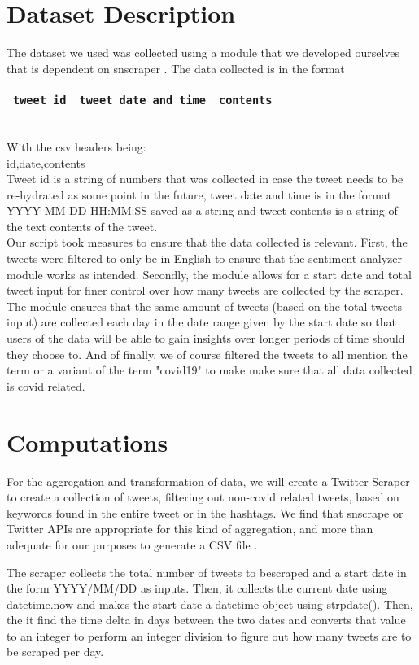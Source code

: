 \documentclass[fontsize=11pt]{article}
\begin{document}
\section*{Dataset Description}

The dataset we used was collected using a module that we developed ourselves that is dependent on snscraper \cite{snscrape}. The data collected is in the format\\
\begin{tabular}{|l|l|l|}
    \hline
    \verb|tweet id| & \verb|tweet date and time| & \verb|contents| \\
    \hline
\end{tabular} \\
With the csv headers being:\\
id,date,contents\\
Tweet id is a string of numbers that was collected in case the tweet needs to be re-hydrated as some point in the future, tweet date and time is in the format YYYY-MM-DD HH:MM:SS saved as a string and tweet contents is a string of the text contents of the tweet.  \\
Our script took measures to ensure that the data collected is relevant. First, the tweets were filtered to only be in English to ensure that the sentiment analyzer module works as intended. Secondly, the module allows for a start date and total tweet input for finer control over how many tweets are collected by the scraper. The module ensures that the same amount of tweets (based on the total tweets input) are collected each day in the date range given by the start date so that users of the data will be able to gain insights over longer periods of time should they choose to. And of finally, we of course filtered the tweets to all mention the term or a variant of the term "covid19" to make make sure that all data collected is covid related.

\section*{Computations}
For the aggregation and transformation of data, we will create a Twitter Scraper to create a collection of tweets, filtering out non-covid related tweets, based on keywords found in the entire tweet or in the hashtags. We find that snscrape or Twitter APIs are appropriate for this kind of aggregation, and more than adequate for our purposes to generate a CSV file \cite{snscrape}.

The scraper collects the total number of tweets to bescraped and a start date in the form YYYY/MM/DD as inputs. Then, it collects the current date using datetime.now and makes the start date a datetime object using strpdate(). Then, the it find the time delta in days between the two dates and converts that value to an integer to perform an integer division to figure out how many tweets are to be scraped per day.
\end{document}

